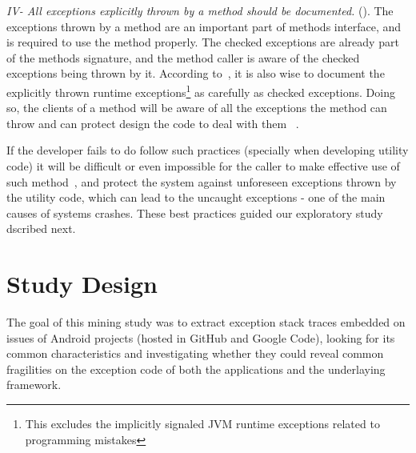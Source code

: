 \documentclass[conference]{IEEEtran}
\begin{document}

\emph{IV- All exceptions explicitly thrown by a method should be documented.}
(\cite{mandrioli1992advances,gosling2000java,wirfs2006toward,bloch2008effective}).
The exceptions thrown by a method are an important part of methods interface,
and is required to use the method properly. The checked exceptions are already
part of the  methods signature, and the method caller is aware of the checked
exceptions being thrown by it. According to~\cite{bloch2008effective}, it is
also wise to document the explicitly thrown runtime exceptions\footnote{This
excludes the implicitly signaled JVM runtime exceptions related to programming
mistakes} as carefully as checked exceptions. Doing so, the clients of a method
will be aware of all the exceptions the method can throw and can protect design the code
to deal with them ~\cite{Robil00}. 

If the developer fails to do follow such practices (specially when developing 
utility code) it will be difficult or even impossible for the caller to 
make effective use of such method~\cite{wirfs2006toward, bloch2008effective},
and protect the system against unforeseen exceptions thrown by the utility code,
which can lead to the uncaught exceptions - one of the main causes of 
systems crashes. These best practices guided our exploratory study dscribed next.




\section{Study Design}
\label{sec:study}


The goal of this mining study was to extract exception stack traces embedded on issues of Android projects 
(hosted in GitHub and Google Code), looking for its 
common characteristics and investigating whether
 they could reveal common fragilities on the exception code of both the 
applications and the underlaying  framework. 
\end{document}
